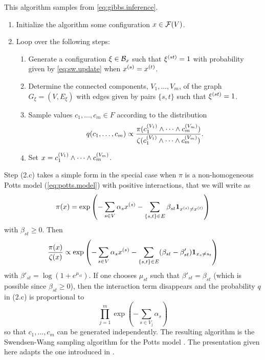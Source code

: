 \begin{enumerate}[label={\bf \alph*.}]
\begin{algorithm}
\label{alg:sw.1}
This algorithm samples from \cref{eq:gibbs.inference}.
\begin{enumerate}
\item Initialize the algorithm some configuration $x \in {\mathcal F}(V)$.
\item Loop over the following steps:
\begin{enumerate}[label=\alph*.,left=0.5cm]
\item Generate a configuration $\xi \in {\mathcal B}_x$ such that $\xi^{(st)} = 1$ with  probability given by \cref{eq:sw.update} when $x^{(s)} = x^{(t)}$.
\item Determine the connected components, $V_1, \ldots, V_m$, of the graph $G_\xi = (V, E_\xi)$ with edges given by pairs $\{s,t\}$ such that $\xi^{(st)} = 1$.
\item Sample values $c_1, \ldots, c_m\in F$ according to the distribution
\[
q(c_1, \ldots, c_m) \propto \frac{\pi(c_1^{(V_1)} \wedge \cdots \wedge c_m^{(V_m)})}{\zeta(c_1^{(V_1)} \wedge \cdots \wedge c_m^{(V_m)})}.
\] 
\item Set $x = c_1^{(V_1)} \wedge \cdots \wedge c_m^{(V_m)}$.
\end{enumerate}
\end{enumerate}
\end{algorithm}
Step (2.c) takes a simple form in the special case when $\pi$ is a non-homogeneous Potts model (\cref{eq:potts.model}) with positive interactions, that we will write as
\[
\pi(x) = \exp\left(- \sum_{s\in V} \alpha_s x^{(s)} - \sum_{\{s,t\}\in E} \beta_{st} {\bm 1}_{x^{(s)}\neq x^{(t)}}\right)
\]
with $\beta_{st} \geq 0$.
Then
\[
\frac{\pi(x)}{\zeta(x)} \propto \exp\left(- \sum_{s\in V} \alpha_s x^{(s)} - \sum_{\{s,t\}\in E} (\beta_{st} - \beta'_{st}){\bm 1}_{x_s\neq s_t}\right)
\]
with $\beta'_{st} = \log(1 +e^{\mu_{st}})$. If one chooses $\mu_{st}$ such that $\beta'_{st} = \beta_{st}$ (which is possible since $\beta_{st}\geq 0$), then the interaction term disappears and the probability $q$ in (2.c) is proportional to 
\[
\prod_{j=1}^m \exp\left(-\sum_{s\in V_j} \alpha_s\right)
\]
so that $c_1, \ldots, c_m$ can be generated independently. The resulting algorithm is the Swendsen-Wang sampling algorithm for the Potts model \citep{swendsen1987nonuniversal}. The presentation given here adapts the one introduced in \citet{barbu2005generalizing}.



\end{enumerate}
